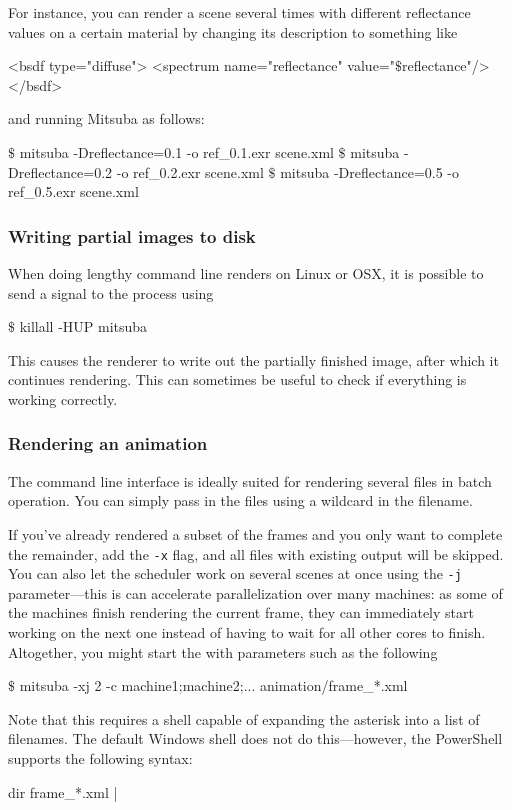 For instance, you can render a scene several times with different reflectance values
on a certain material by changing its description to something like
\begin{xml}
<bsdf type="diffuse">
    <spectrum name="reflectance" value="$\texttt{\$}$reflectance"/>
</bsdf>
\end{xml}
and running Mitsuba as follows:
\begin{shell}
$\texttt{\$}$ mitsuba -Dreflectance=0.1 -o ref_0.1.exr scene.xml
$\texttt{\$}$ mitsuba -Dreflectance=0.2 -o ref_0.2.exr scene.xml
$\texttt{\$}$ mitsuba -Dreflectance=0.5 -o ref_0.5.exr scene.xml
\end{shell}

\subsubsection{Writing partial images to disk}
When doing lengthy command line renders on Linux or OSX, it is possible
to send a signal to the process using
\begin{shell}
$\texttt{\$}$ killall -HUP mitsuba
\end{shell}
This causes the renderer to write out the partially finished
image, after which it continues rendering. This can sometimes be useful to
check if everything is working correctly.

\subsubsection{Rendering an animation}
The command line interface is ideally suited for rendering several files in batch
operation. You can simply pass in the files using a wildcard in the filename.

If you've already rendered a subset of the frames and you only want to complete the remainder,
add the \texttt{-x} flag, and all files with existing output will be skipped. You can also
let the scheduler work on several scenes at once using the \texttt{-j} parameter---this is
can accelerate parallelization over many machines: as some of the machines
finish rendering the current frame, they can immediately start working on the next one
instead of having to wait for all other cores to finish. Altogether, you
might start the with parameters such as the following
\begin{shell}
$\texttt{\$}$ mitsuba -xj 2 -c machine1;machine2;...  animation/frame_*.xml
\end{shell}
Note that this requires a shell capable of expanding the asterisk into a list of
filenames. The default Windows shell  does not do this---however,
the PowerShell supports the following syntax:
\begin{shell}
dir frame_*.xml | %
\end{shell}

